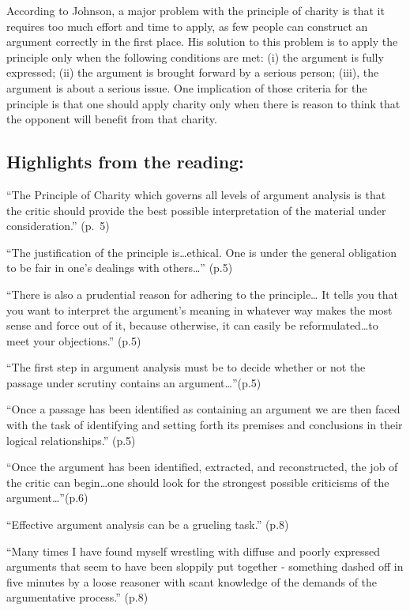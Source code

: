 \documentclass[
]{book}
\begin{document}
According to Johnson, a major problem with the principle of charity is that it requires too much effort and time to apply, as few people can construct an argument correctly in the first place. His solution to this problem is to apply the principle only when the following conditions are met: (i) the argument is fully expressed; (ii) the argument is brought forward by a serious person; (iii), the argument is about a serious issue. One implication of those criteria for the principle is that one should apply charity only when there is reason to think that the opponent will benefit from that charity.

\hypertarget{highlights-from-the-reading-3}{%
\subsection{Highlights from the reading:}\label{highlights-from-the-reading-3}}

``The Principle of Charity which governs all levels of argument analysis is that the critic should provide the best possible interpretation of the material under consideration.'' (p.~5)

``The justification of the principle is\ldots ethical. One is under the general obligation to be fair in one's dealings with others\ldots{}'' (p.5)

``There is also a prudential reason for adhering to the principle\ldots{} It tells you that you want to interpret the argument's meaning in whatever way makes the most sense and force out of it, because otherwise, it can easily be reformulated\ldots to meet your objections.'' (p.5)

``The first step in argument analysis must be to decide whether or not the passage under scrutiny contains an argument\ldots{}''(p.5)

``Once a passage has been identified as containing an argument we are then faced with the task of identifying and setting forth its premises and conclusions in their logical relationships.'' (p.5)

``Once the argument has been identified, extracted, and reconstructed, the job of the critic can begin\ldots one should look for the strongest possible criticisms of the argument\ldots{}''(p.6)

``Effective argument analysis can be a grueling task.'' (p.8)

``Many times I have found myself wrestling with diffuse and poorly expressed arguments that seem to have been sloppily put together - something dashed off in five minutes by a loose reasoner with scant knowledge of the demands of the argumentative process.'' (p.8)
\end{document}
